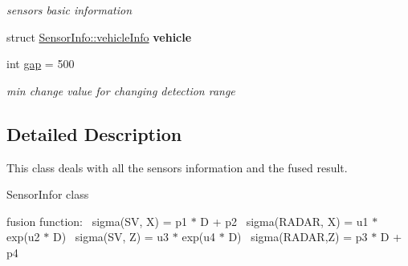\begin{DoxyCompactItemize}
\begin{DoxyCompactList}\small\item\em sensors\textquotesingle{} basic information \end{DoxyCompactList}\item 
\hypertarget{class_sensor_info_ac3340fdef4056a7b024fa2286abe8bca}{}struct \hyperlink{struct_sensor_info_1_1vehicle_info}{Sensor\+Info\+::vehicle\+Info} {\bfseries vehicle}\label{class_sensor_info_ac3340fdef4056a7b024fa2286abe8bca}

\item 
\hypertarget{class_sensor_info_a59fc17191072e0c3bd1ebe41b4979bd1}{}int \hyperlink{class_sensor_info_a59fc17191072e0c3bd1ebe41b4979bd1}{gap} = 500\label{class_sensor_info_a59fc17191072e0c3bd1ebe41b4979bd1}

\begin{DoxyCompactList}\small\item\em min change value for changing detection range \end{DoxyCompactList}\end{DoxyCompactItemize}


\subsection{Detailed Description}
This class deals with all the sensors\textquotesingle{} information and the fused result. 

Sensor\+Infor class

fusion function\+:~\newline
 sigma(\+S\+V, X) = p1 $\ast$ D + p2~\newline
 sigma(\+R\+A\+D\+A\+R, X) = u1 $\ast$ exp(u2 $\ast$ D)~\newline
 sigma(\+S\+V, Z) = u3 $\ast$ exp(u4 $\ast$ D)~\newline
 sigma(\+R\+A\+D\+A\+R,\+Z) = p3 $\ast$ D + p4 

